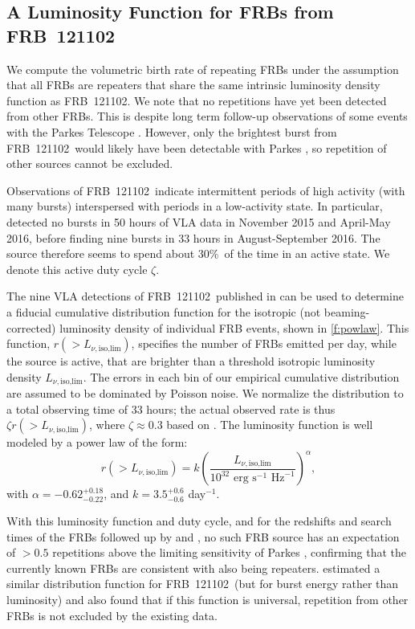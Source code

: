 \documentclass[twocolumn]{aastex6}
\newcommand{\Lnil}{\ensuremath{L_{\nu,\text{iso,lim}}}}
\newcommand{\repeater}{FRB~121102}
\begin{document}
\subsection{A Luminosity Function for FRBs from \repeater}

We compute the volumetric birth rate of repeating FRBs under the assumption that all FRBs are repeaters that share the same intrinsic luminosity density function as \repeater. We note that no repetitions have yet been detected from other FRBs. This is despite long term follow-up observations of some events with the Parkes Telescope \citep{petroff2015b,Ravi+15}. However, only the brightest burst from \repeater\ would likely have been detectable with Parkes \citep{ssh+.2016,sch2016}, so repetition of other sources cannot be excluded.

Observations of \repeater\ indicate intermittent periods of high activity (with many bursts) interspersed with periods in a low-activity state. In particular, \citet{clw+.2017} detected no bursts in 50 hours of VLA data in November 2015 and April-May 2016, before finding nine bursts in 33 hours in August-September 2016. The source therefore seems to spend about 30\%\ of the time in an active state. We denote this active duty cycle $\zeta$.

The nine VLA detections of \repeater\ published in \citet{clw+.2017} can be used to determine a fiducial cumulative distribution function for the isotropic (not beaming-corrected) luminosity density of individual FRB events, shown in \autoref{f:powlaw}. This function, $r({>}\Lnil)$, specifies the number of FRBs emitted per day, while the source is active, that are brighter than a threshold isotropic luminosity density \Lnil. The errors in each bin of our empirical cumulative distribution are assumed to be dominated by Poisson noise. We normalize the distribution to a total observing time of 33 hours; the actual observed rate is thus $\zeta r({>}\Lnil)$, where $\zeta \approx 0.3$ based on \citet{clw+.2017}.  The luminosity function is well modeled by a power law of the form:
\begin{equation}
r({>}\Lnil) = k \left(\frac{\Lnil}{10^{32}\text{ erg s}^{-1}\text{ Hz}^{-1}}\right)^\alpha,
\label{e:powlaw}
\end{equation}
with $\alpha = -0.62^{+0.18}_{-0.22}$, and $k = 3.5^{+0.6}_{-0.6}$ day$^{-1}$. 

With this luminosity function and duty cycle, and for the redshifts and search times of the FRBs followed up by \citet{petroff2015b} and \citet{Ravi+15}, no such FRB source has an expectation of $>0.5$ repetitions above the limiting sensitivity of Parkes \citep[$\approx 0.15$\,Jy;][]{sch2016}, confirming that the currently known FRBs are consistent with also being repeaters. \citet{lu2016} estimated a similar distribution function for \repeater\ (but for burst energy rather than luminosity) and also found that if this function is universal, repetition from other FRBs is not excluded by the existing data.
\end{document}
